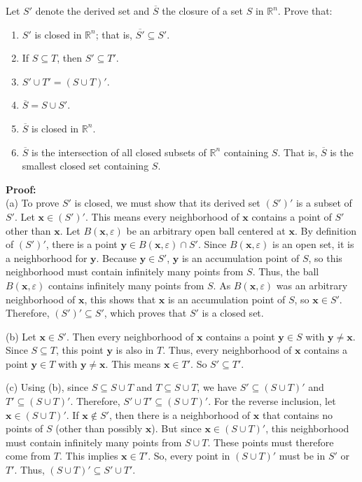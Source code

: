 \begin{problembox}
Let $S'$ denote the derived set and $\overline{S}$ the closure of a set $S$ in $\mathbb{R}^n$. Prove that:
\begin{enumerate}[label=\alph*)]
\item $S'$ is closed in $\mathbb{R}^n$; that is, $\overline{S'} \subseteq S'$.
\item If $S \subseteq T$, then $S' \subseteq T'$.
\item $S' \cup T' = (S \cup T)'$.
\item $\overline{S} = S \cup S'$.
\item $\overline{S}$ is closed in $\mathbb{R}^n$.
\item $\overline{S}$ is the intersection of all closed subsets of $\mathbb{R}^n$ containing $S$. That is, $\overline{S}$ is the smallest closed set containing $S$.
\end{enumerate}
\end{problembox}
\textbf{Proof:}\\
(a) To prove $S'$ is closed, we must show that its derived set $(S')'$ is a subset of $S'$. Let $\mathbf{x} \in (S')'$. This means every neighborhood of $\mathbf{x}$ contains a point of $S'$ other than $\mathbf{x}$. Let $B(\mathbf{x}, \varepsilon)$ be an arbitrary open ball centered at $\mathbf{x}$. By definition of $(S')'$, there is a point $\mathbf{y} \in B(\mathbf{x}, \varepsilon) \cap S'$. Since $B(\mathbf{x}, \varepsilon)$ is an open set, it is a neighborhood for $\mathbf{y}$. Because $\mathbf{y} \in S'$, $\mathbf{y}$ is an accumulation point of $S$, so this neighborhood must contain infinitely many points from $S$. Thus, the ball $B(\mathbf{x}, \varepsilon)$ contains infinitely many points from $S$. As $B(\mathbf{x}, \varepsilon)$ was an arbitrary neighborhood of $\mathbf{x}$, this shows that $\mathbf{x}$ is an accumulation point of $S$, so $\mathbf{x} \in S'$. Therefore, $(S')' \subseteq S'$, which proves that $S'$ is a closed set.

(b) Let $\mathbf{x} \in S'$. Then every neighborhood of $\mathbf{x}$ contains a point $\mathbf{y} \in S$ with $\mathbf{y} \neq \mathbf{x}$. Since $S \subseteq T$, this point $\mathbf{y}$ is also in $T$. Thus, every neighborhood of $\mathbf{x}$ contains a point $\mathbf{y} \in T$ with $\mathbf{y} \neq \mathbf{x}$. This means $\mathbf{x} \in T'$. So $S' \subseteq T'$.

(c) Using (b), since $S \subseteq S \cup T$ and $T \subseteq S \cup T$, we have $S' \subseteq (S \cup T)'$ and $T' \subseteq (S \cup T)'$. Therefore, $S' \cup T' \subseteq (S \cup T)'$. For the reverse inclusion, let $\mathbf{x} \in (S \cup T)'$. If $\mathbf{x} \notin S'$, then there is a neighborhood of $\mathbf{x}$ that contains no points of $S$ (other than possibly $\mathbf{x}$). But since $\mathbf{x} \in (S \cup T)'$, this neighborhood must contain infinitely many points from $S \cup T$. These points must therefore come from $T$. This implies $\mathbf{x} \in T'$. So, every point in $(S \cup T)'$ must be in $S'$ or $T'$. Thus, $(S \cup T)' \subseteq S' \cup T'$.

